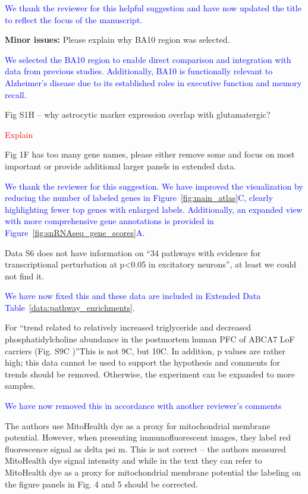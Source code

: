 \textcolor{blue}{We thank the reviewer for this helpful suggestion and have now updated the title to reflect the focus of the manuscript.}

\textbf{Minor issues:}
Please explain why BA10 region was selected.

\textcolor{blue}{We selected the BA10 region to enable direct comparison and integration with data from previous studies. Additionally, BA10 is functionally relevant to Alzheimer's disease due to its established roles in executive function and memory recall.}

Fig S1H – why astrocytic marker expression overlap with glutamatergic?
	
\textcolor{red}{Explain}

Fig 1F has too many gene names, please either remove some and focus on most important or provide additional larger panels in extended data.
	
\textcolor{blue}{We thank the reviewer for this suggestion. We have improved the visualization by reducing the number of labeled genes in Figure~\ref{fig:main_atlas}C, clearly highlighting fewer top genes with enlarged labels. Additionally, an expanded view with more comprehensive gene annotations is provided in Figure~\ref{fig:snRNAseq_gene_scores}A.}

Data S6 does not have information on “34 pathways with evidence for transcriptional perturbation at p<0.05 in excitatory neurons”, at least we could not find it.

\textcolor{blue}{We have now fixed this and these data are included in Extended Data Table~\ref{data:pathway_enrichments}.}

For “trend related to relatively increased triglyceride and decreased phosphatidylcholine abundance in the postmortem human PFC of ABCA7 LoF carriers (Fig. S9C )”This is not 9C, but 10C. In addition, p values are rather high; this data cannot be used to support the hypothesis and comments for trends should be removed. Otherwise, the experiment can be expanded to more samples.

\textcolor{blue}{We have now removed this in accordance with another reviewer's comments}

The authors use MitoHealth dye as a proxy for mitochondrial membrane potential. However, when presenting immunofluorescent images, they label red fluorescence signal as delta psi m. This is not correct – the authors measured MitoHealth dye signal intensity and while in the text they can refer to MitoHealth dye as a proxy for mitochondrial membrane potential the labeling on the figure panels in Fig. 4 and 5 should be corrected.

